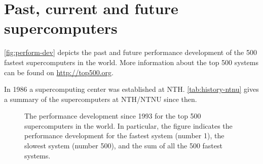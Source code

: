 \section{Past, current and future supercomputers}

\autoref{fig:perform-dev} depicts the past and future performance development
of the 500 fastest supercomputers in the world. More information about the top
500 systems can be found on \url{http://top500.org}.

In 1986 a supercomputing center was established at NTH.
\autoref{tab:history-ntnu} gives a summary of the supercomputers at NTH/NTNU
since then.

\begin{figure}
  \centering
  \caption{
    The performance development since 1993 for the top 500 supercomputers in the
    world. In particular, the figure indicates the performance development for
    the fastest system (number 1), the slowest system (number 500), and the sum
    of all the 500 fastest systems.
  }
  \label{fig:perform-dev}
\end{figure}

